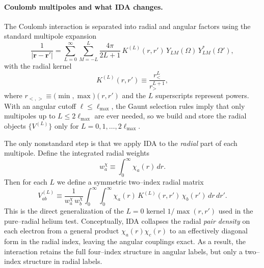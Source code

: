 \documentclass[aps,pra,reprint,longbibliography,nofootinbib]{revtex4-2}
\newcommand{\br}{\mathbf r}
\begin{document}
\paragraph{Coulomb multipoles and what IDA changes.}
The Coulomb interaction is separated into radial and angular factors using the standard multipole expansion
\begin{equation}
\frac{1}{|\br-\br'|}
=
\sum_{L=0}^{\infty}\sum_{M=-L}^{L}
\frac{4\pi}{2L+1}\,
K^{(L)}(r,r')\,
Y_{LM}(\Omega)\,Y_{LM}^*(\Omega'),
\end{equation}
with the radial kernel
\begin{equation}
K^{(L)}(r,r') \equiv \frac{r_<^L}{r_>^{L+1}},
\end{equation}
where $r_{<,>} \equiv \big(\min,\max\big)(r,r')$ and the $L$ superscripts represent powers.
With an angular cutoff $\ell\le \ell_{\max}$, the Gaunt selection rules imply that only
multipoles up to $L\le 2\ell_{\max}$ are ever needed, so we build and store the radial objects
$\{V^{(L)}\}$ only for $L=0,1,\ldots,2\ell_{\max}$.

The only nonstandard step is that we apply IDA to the
\emph{radial} part of each multipole.  Define the integrated radial weights
\begin{equation}
w_a^\chi \equiv \int_0^\infty \chi_a(r)\,dr.
\end{equation}
Then for each $L$ we define a symmetric two--index radial matrix
\begin{equation}
\label{eq:VL_def}
V^{(L)}_{ab}
\equiv
\frac{1}{w_a^\chi\,w_b^\chi}
\int_0^\infty\!\!\int_0^\infty
\chi_a(r)\,K^{(L)}(r,r')\,\chi_b(r')\,dr\,dr'.
\end{equation}
This is the direct generalization of the $L=0$ kernel $1/\max(r,r')$ used in the pure--radial helium test.
Conceptually, IDA collapses the radial \emph{pair density} on each electron from a general product
$\chi_a(r)\chi_c(r)$ to an effectively diagonal form in the radial index, leaving the angular couplings exact.
As a result, the interaction retains the full four--index structure in angular labels, but only a
two--index structure in radial labels.
\end{document}
